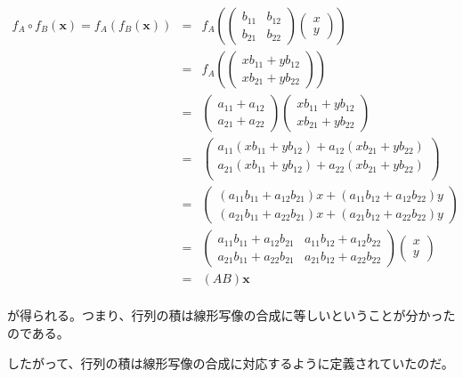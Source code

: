 \documentclass[dvipdfmx,autodetect-engine]{jsarticle}
\theoremstyle{definition}
\begin{document}
\begin{eqnarray*}
f_A \circ f_B(\bm{x}) = f_A(f_B(\bm{x})) &= &f_A(\begin{pmatrix}
b_{11} & b_{12} \\
b_{21} & b_{22}
\end{pmatrix} \begin{pmatrix}
x \\
y
\end{pmatrix}) \\
&= &f_A(\begin{pmatrix}
xb_{11} + yb_{12} \\
xb_{21} + yb_{22}
\end{pmatrix}) \\
&= &\begin{pmatrix}
a_{11} + a_{12} \\
a_{21} + a_{22}
\end{pmatrix} 
\begin{pmatrix}
xb_{11} + yb_{12} \\
xb_{21} + yb_{22}
\end{pmatrix} \\
& = &\begin{pmatrix}
a_{11}(xb_{11} + yb_{12}) + a_{12}(xb_{21} + yb_{22}) \\
a_{21}(xb_{11} + yb_{12}) + a_{22}(xb_{21} + yb_{22}) \\
\end{pmatrix} \\
& = &\begin{pmatrix}
(a_{11}b_{11} + a_{12}b_{21})x + (a_{11}b_{12} + a_{12}b_{22})y \\
(a_{21}b_{11} + a_{22}b_{21})x + (a_{21}b_{12} + a_{22}b_{22})y
\end{pmatrix} \\
& = &\begin{pmatrix}
a_{11}b_{11} + a_{12}b_{21} & a_{11}b_{12} + a_{12}b_{22} \\
a_{21}b_{11} + a_{22}b_{21} & a_{21}b_{12} + a_{22}b_{22}
\end{pmatrix}
\begin{pmatrix}
x \\
y
\end{pmatrix} \\
&= &(AB)\bm{x} \\
\end{eqnarray*}

が得られる。つまり、行列の積は線形写像の合成に等しいということが分かったのである。

したがって、行列の積は線形写像の合成に対応するように定義されていたのだ。
\end{document}
